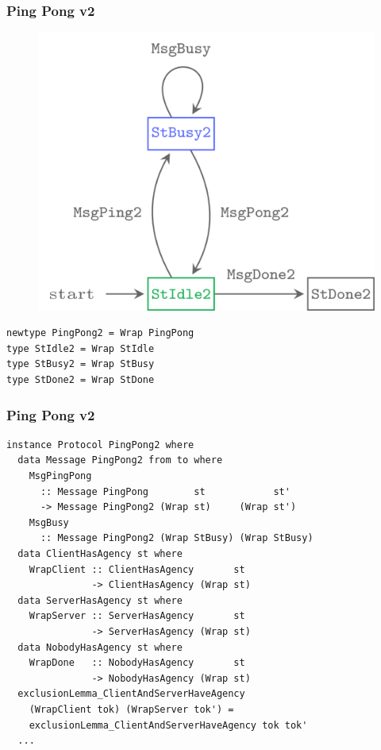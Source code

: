 \documentclass[t,dvipsnames]{beamer}
\begin{document}
\begin{frame}[fragile]
  \frametitle{Ping Pong v2}
  \begin{figure}
    \includegraphics{../images/ping-pong-3.png}
  \end{figure}
  \begin{verbatim}
newtype PingPong2 = Wrap PingPong
type StIdle2 = Wrap StIdle
type StBusy2 = Wrap StBusy
type StDone2 = Wrap StDone
  \end{verbatim}
\end{frame}

\begin{frame}[fragile]
  \frametitle{Ping Pong v2}
  \begin{verbatim}
instance Protocol PingPong2 where
  data Message PingPong2 from to where
    MsgPingPong
      :: Message PingPong        st            st'
      -> Message PingPong2 (Wrap st)     (Wrap st')
    MsgBusy
      :: Message PingPong2 (Wrap StBusy) (Wrap StBusy)
  data ClientHasAgency st where
    WrapClient :: ClientHasAgency       st
               -> ClientHasAgency (Wrap st)
  data ServerHasAgency st where
    WrapServer :: ServerHasAgency       st
               -> ServerHasAgency (Wrap st)
  data NobodyHasAgency st where
    WrapDone   :: NobodyHasAgency       st
               -> NobodyHasAgency (Wrap st)
  exclusionLemma_ClientAndServerHaveAgency
    (WrapClient tok) (WrapServer tok') =
    exclusionLemma_ClientAndServerHaveAgency tok tok'
  ...
  \end{verbatim}
\end{frame}
\end{document}
